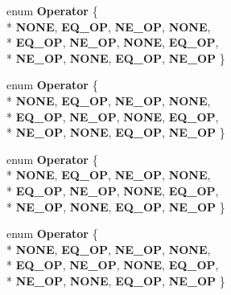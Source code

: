 \begin{DoxyCompactItemize}
\item 
enum {\bfseries Operator} \{ \\*
{\bfseries N\-O\-N\-E}, 
{\bfseries E\-Q\-\_\-\-O\-P}, 
{\bfseries N\-E\-\_\-\-O\-P}, 
{\bfseries N\-O\-N\-E}, 
\\*
{\bfseries E\-Q\-\_\-\-O\-P}, 
{\bfseries N\-E\-\_\-\-O\-P}, 
{\bfseries N\-O\-N\-E}, 
{\bfseries E\-Q\-\_\-\-O\-P}, 
\\*
{\bfseries N\-E\-\_\-\-O\-P}, 
{\bfseries N\-O\-N\-E}, 
{\bfseries E\-Q\-\_\-\-O\-P}, 
{\bfseries N\-E\-\_\-\-O\-P}
 \}
\item 
enum {\bfseries Operator} \{ \\*
{\bfseries N\-O\-N\-E}, 
{\bfseries E\-Q\-\_\-\-O\-P}, 
{\bfseries N\-E\-\_\-\-O\-P}, 
{\bfseries N\-O\-N\-E}, 
\\*
{\bfseries E\-Q\-\_\-\-O\-P}, 
{\bfseries N\-E\-\_\-\-O\-P}, 
{\bfseries N\-O\-N\-E}, 
{\bfseries E\-Q\-\_\-\-O\-P}, 
\\*
{\bfseries N\-E\-\_\-\-O\-P}, 
{\bfseries N\-O\-N\-E}, 
{\bfseries E\-Q\-\_\-\-O\-P}, 
{\bfseries N\-E\-\_\-\-O\-P}
 \}
\item 
enum {\bfseries Operator} \{ \\*
{\bfseries N\-O\-N\-E}, 
{\bfseries E\-Q\-\_\-\-O\-P}, 
{\bfseries N\-E\-\_\-\-O\-P}, 
{\bfseries N\-O\-N\-E}, 
\\*
{\bfseries E\-Q\-\_\-\-O\-P}, 
{\bfseries N\-E\-\_\-\-O\-P}, 
{\bfseries N\-O\-N\-E}, 
{\bfseries E\-Q\-\_\-\-O\-P}, 
\\*
{\bfseries N\-E\-\_\-\-O\-P}, 
{\bfseries N\-O\-N\-E}, 
{\bfseries E\-Q\-\_\-\-O\-P}, 
{\bfseries N\-E\-\_\-\-O\-P}
 \}
\item 
enum {\bfseries Operator} \{ \\*
{\bfseries N\-O\-N\-E}, 
{\bfseries E\-Q\-\_\-\-O\-P}, 
{\bfseries N\-E\-\_\-\-O\-P}, 
{\bfseries N\-O\-N\-E}, 
\\*
{\bfseries E\-Q\-\_\-\-O\-P}, 
{\bfseries N\-E\-\_\-\-O\-P}, 
{\bfseries N\-O\-N\-E}, 
{\bfseries E\-Q\-\_\-\-O\-P}, 
\\*
{\bfseries N\-E\-\_\-\-O\-P}, 
{\bfseries N\-O\-N\-E}, 
{\bfseries E\-Q\-\_\-\-O\-P}, 
{\bfseries N\-E\-\_\-\-O\-P}
 \}
\end{DoxyCompactItemize}
